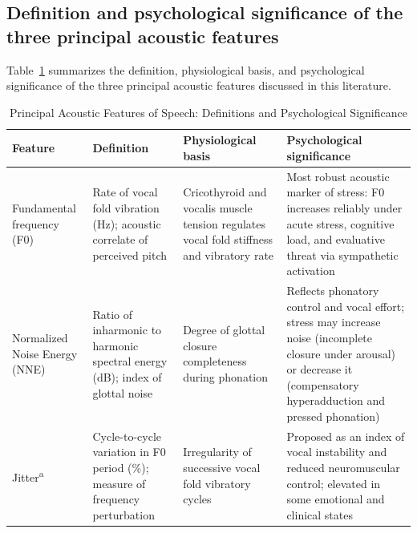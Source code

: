 \documentclass[
  english,
  man,floatsintext]{apa6}
\begin{document}
\subsection{Definition and psychological significance of the three principal acoustic features}\label{definition-and-psychological-significance-of-the-three-principal-acoustic-features}

Table~\ref{tab:acoustic-features} summarizes the definition, physiological basis, and psychological significance of the three principal acoustic features discussed in this literature.

\begin{table}[p]
\centering
\caption{Principal Acoustic Features of Speech: Definitions and Psychological Significance}
\label{tab:acoustic-features}
\begin{threeparttable}
\scriptsize
\begin{tabular}{p{2.4cm} p{3.2cm} p{2.6cm} p{3.0cm}}
\hline
Feature & Definition & Physiological basis & Psychological significance \\
\hline
Fundamental frequency (F0) & Rate of vocal fold vibration (Hz); acoustic correlate of perceived pitch & 
Cricothyroid and vocalis muscle tension regulates vocal fold stiffness and vibratory rate & 
Most robust acoustic marker of stress: F0 increases reliably under acute stress, cognitive load, and evaluative threat via sympathetic activation \\[4pt]

Normalized Noise Energy (NNE) & Ratio of inharmonic to harmonic spectral energy (dB); index of glottal noise & 
Degree of glottal closure completeness during phonation & 
Reflects phonatory control and vocal effort; stress may increase noise (incomplete closure under arousal) or decrease it (compensatory hyperadduction and pressed phonation) \\[4pt]

Jitter\textsuperscript{a} & Cycle-to-cycle variation in F0 period (\%); measure of frequency perturbation & 
Irregularity of successive vocal fold vibratory cycles & 
Proposed as an index of vocal instability and reduced neuromuscular control; elevated in some emotional and clinical states \\
\hline
\end{tabular}


\end{threeparttable}
\end{table}
\end{document}

